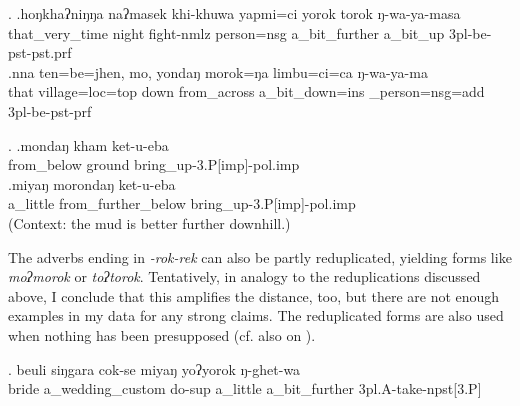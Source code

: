 \ex. \ag.hoŋkhaʔniŋŋa   naʔmasek    khi-khuwa          yapmi=ci     yorok      torok      ŋ-wa-ya-masa\\
that\_very\_time night fight{\sc -nmlz} person{\sc =nsg} a\_bit\_further a\_bit\_up {\sc 3pl-}be{\sc -pst-pst.prf}\\
 
\bg.nna  ten=be=jhen,         mo,   yondaŋ    morok=ŋa       limbu=ci=ca           ŋ-wa-ya-ma\\
that village{\sc =loc=top} down from\_across a\_bit\_down{\sc =ins} \_person{\sc =nsg=add} {\sc 3pl-}be{\sc -pst-prf}\\
 

\ex. \ag.mondaŋ kham ket-u-eba\\
from\_below ground bring\_up{\sc -3.P[imp]-pol.imp}\\
\bg.miyaŋ morondaŋ ket-u-eba\\
a\_little from\_further\_below bring\_up{\sc -3.P[imp]-pol.imp}\\
 (Context: the mud is better further downhill.)

The adverbs ending in \emph{-rok\ti -rek} can also be partly reduplicated, yielding forms like \emph{moʔmorok} or \emph{toʔtorok}. Tentatively, in analogy to the reduplications discussed above, I conclude that this amplifies the distance, too, but there are not enough examples in my data for any strong claims. The reduplicated forms are also  used when nothing has been presupposed (cf. also  on ).
 
\exg.  beuli siŋgara         cok-se         miyaŋ yoʔyorok ŋ-ghet-wa\\
bride a\_wedding\_custom do{\sc -sup} a\_little a\_bit\_further {\sc 3pl.A-}take{\sc -npst[3.P]}\\
 


